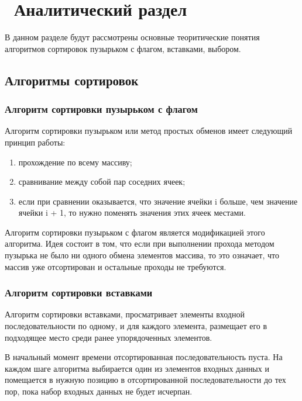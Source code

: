 \chapter{ Аналитический раздел}
\label{cha:analytical}
    В данном разделе будут рассмотрены основные теоритические понятия алгоритмов сортировок
    пузырьком с флагом, вставками, выбором.

    \section{Алгоритмы сортировок}
        \subsection{ Алгоритм сортировки пузырьком с флагом}
            Алгоритм сортировки пузырьком или метод простых обменов имеет следующий 
            принцип работы:
            \begin{enumerate}
                \item прохождение по всему массиву;
                \item сравнивание между собой пар соседних ячеек;
                \item если при сравнении оказывается, что значение ячейки i больше, чем значение ячейки i + 1,
                то нужно поменять значения этих ячеек местами.
            \end{enumerate}

            Алгоритм сортировки пузырьком с флагом является модификацией этого алгоритма.
            Идея состоит в том, что если при выполнении прохода методом пузырька не 
            было ни одного обмена элементов массива, то это означает, что массив уже
            отсортирован и остальные проходы не требуются.

        \subsection{ Алгоритм сортировки вставками}
            Алгоритм сортировки вставками, просматривает элементы входной последовательности по одному,
            и для каждого элемента, размещает его в подходящее место среди ранее упорядоченных элементов.
            
            В начальный момент времени отсортированная последовательность пуста. 
            На каждом шаге алгоритма выбирается один из элементов входных данных и
            помещается в нужную позицию в отсортированной последовательности до тех пор,
            пока набор входных данных не будет исчерпан. 
            
